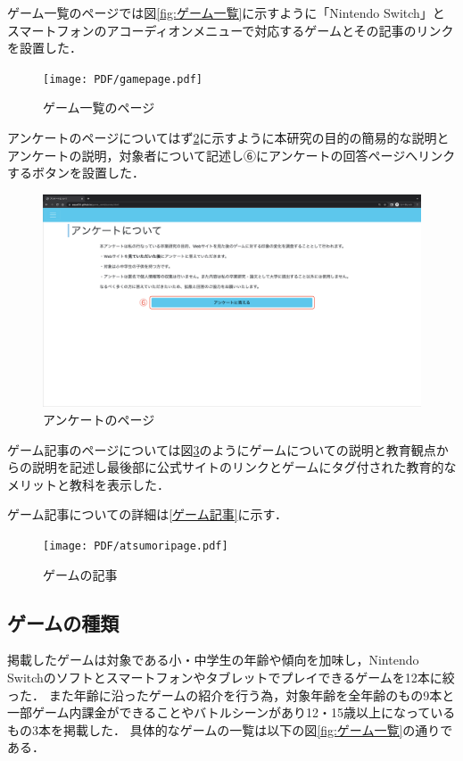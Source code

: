 ゲーム一覧のページでは図\ref{fig:ゲーム一覧}に示すように「Nintendo Switch」とスマートフォンのアコーディオンメニューで対応するゲームとその記事のリンクを設置した．

\begin{figure}[H]
\begin{center}
 \texttt{[image: PDF/gamepage.pdf]}
\end{center}
 \caption{ゲーム一覧のページ}
 \label{fig:ゲーム一覧ページ}
\end{figure}

アンケートのページについてはず\ref{fig:アンケートページ}に示すように本研究の目的の簡易的な説明とアンケートの説明，対象者について記述し⑥にアンケートの回答ページへリンクするボタンを設置した．

\begin{figure}[H]
\begin{center}
 \includegraphics[keepaspectratio, scale=0.15]{PDF/anquepage.pdf}
\end{center}
 \caption{アンケートのページ}
 \label{fig:アンケートページ}
\end{figure}

ゲーム記事のページについては図\ref{fig:ゲームの記事}のようにゲームについての説明と教育観点からの説明を記述し最後部に公式サイトのリンクとゲームにタグ付された教育的なメリットと教科を表示した．

ゲーム記事についての詳細は\ref{ゲーム記事}に示す．

\begin{figure}[H]
\begin{center}
 \texttt{[image: PDF/atsumoripage.pdf]}
\end{center}
 \caption{ゲームの記事}
 \label{fig:ゲームの記事}
\end{figure}

\subsection{ゲームの種類}\label{ゲームの種類}
掲載したゲームは対象である小・中学生の年齢や傾向を加味し，Nintendo Switchのソフトとスマートフォンやタブレットでプレイできるゲームを12本に絞った．
また年齢に沿ったゲームの紹介を行う為，対象年齢を全年齢のもの9本と一部ゲーム内課金ができることやバトルシーンがあり12・15歳以上になっているもの3本を掲載した．
具体的なゲームの一覧は以下の図\ref{fig:ゲーム一覧}の通りである．

